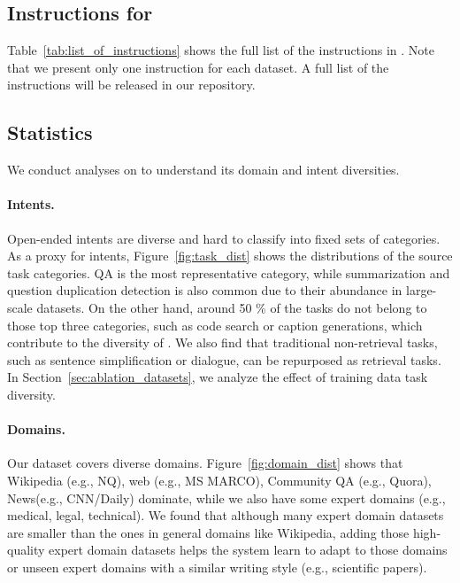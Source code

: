 \subsection{Instructions for \rib}
\label{sec:list_of_instructions}
Table~\ref{tab:list_of_instructions} shows the full list of the instructions in \rib. 
Note that we present only one instruction for each dataset. A full list of the instructions will be released in our repository. 

\subsection{\rib Statistics}
\label{sec:dataset_analysis}
We conduct analyses on \rib to understand its domain and intent diversities. 


\paragraph{Intents.}
Open-ended intents are diverse and hard to classify into fixed sets of categories. As a proxy for intents, Figure~\ref{fig:task_dist} shows the distributions of the source task categories. 
QA is the most representative category, while summarization and question duplication detection is also common due to their abundance in large-scale datasets. 
On the other hand, 
around 50 \% of the tasks do not belong to those top three categories, such as code search or caption generations, which contribute to the diversity of \rib. 
We also find that traditional non-retrieval tasks, such as sentence simplification or dialogue, can be repurposed as retrieval tasks. In Section~\ref{sec:ablation_datasets}, we analyze the effect of training data task diversity. 

\paragraph{Domains.}
Our dataset covers diverse domains. Figure~\ref{fig:domain_dist} shows that Wikipedia (e.g., NQ), web (e.g., MS MARCO), Community QA (e.g., Quora), News(e.g., CNN/Daily) dominate, while we also have some expert domains (e.g., medical, legal, technical). 
We found that although many expert domain datasets are smaller than the ones in general domains like Wikipedia, adding those high-quality expert domain datasets helps the system learn to adapt to those domains or unseen expert domains with a similar writing style (e.g., scientific papers). 


